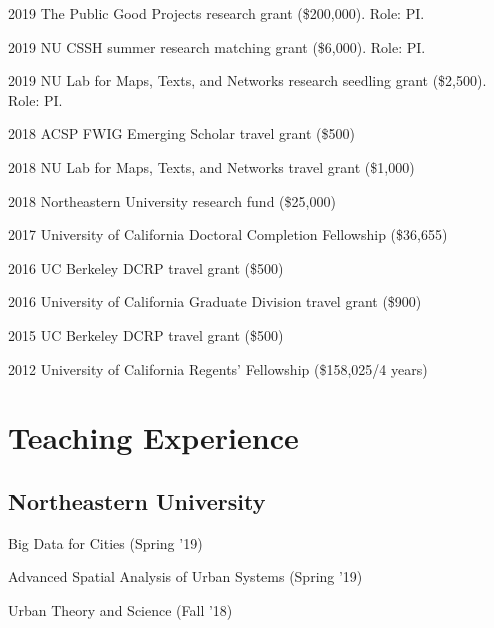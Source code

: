\documentclass[12pt,letterpaper]{report}
\newcommand{\listitemspace}{0.15em}
\renewenvironment{itemize}
{\begin{list}{}{\setlength{\leftmargin}{0em}
			\setlength{\parskip}{0em}
			\setlength{\itemsep}{\listitemspace}
			\setlength{\parsep}{\listitemspace}}}
	{\end{list}}
\begin{document}
	\begin{tablist}

		\item[2019] \tab The Public Good Projects research grant (\$200,000). Role: PI.

		\item[2019] \tab NU CSSH summer research matching grant (\$6,000). Role: PI.

		\item[2019] \tab NU Lab for Maps, Texts, and Networks research seedling grant (\$2,500). Role: PI.

		\item[2018] \tab ACSP FWIG Emerging Scholar travel grant (\$500)

		\item[2018] \tab NU Lab for Maps, Texts, and Networks travel grant (\$1,000)

		\item[2018] \tab Northeastern University research fund (\$25,000)

		\item[2017] \tab University of California Doctoral Completion Fellowship (\$36,655)

		\item[2016] \tab UC Berkeley DCRP travel grant (\$500)

		\item[2016] \tab University of California Graduate Division travel grant (\$900)

		\item[2015] \tab UC Berkeley DCRP travel grant (\$500)

		\item[2012] \tab University of California Regents' Fellowship (\$158,025/4 years)

	\end{tablist}



	\section*{Teaching Experience}

	\subsection*{Northeastern University}

	\begin{itemize}

		\item Big Data for Cities (Spring '19)

		\item Advanced Spatial Analysis of Urban Systems (Spring '19)

		\item Urban Theory and Science (Fall '18)

	\end{itemize}
\end{document}
